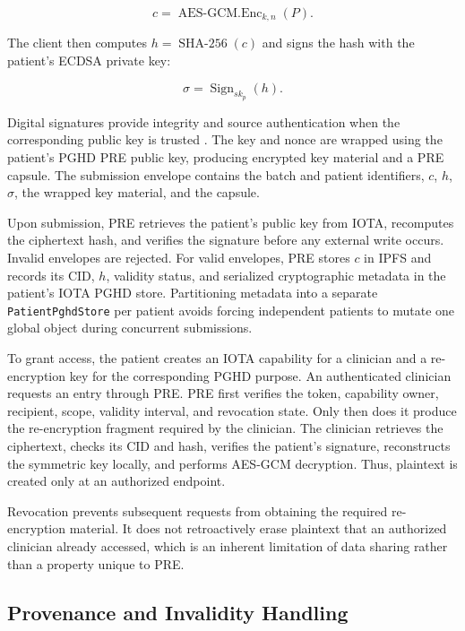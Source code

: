 \begin{equation}
	c = \operatorname{AES\text{-}GCM.Enc}_{k,n}(P).
	\label{eq:encrypt}
\end{equation}

The client then computes \(h=\operatorname{SHA\text{-}256}(c)\) and signs the hash with the patient's ECDSA private key:

\begin{equation}
	\sigma = \operatorname{Sign}_{sk_p}(h).
	\label{eq:signature}
\end{equation}

Digital signatures provide integrity and source authentication when the corresponding public key is trusted \cite{NIST_FIPS186-5}.
The key and nonce are wrapped using the patient's PGHD PRE public key, producing encrypted key material and a PRE capsule.
The submission envelope contains the batch and patient identifiers, \(c\), \(h\), \(\sigma\), the wrapped key material, and the capsule.

Upon submission, PRE retrieves the patient's public key from IOTA, recomputes the ciphertext hash, and verifies the signature before any external write occurs.
Invalid envelopes are rejected.
For valid envelopes, PRE stores \(c\) in IPFS and records its CID, \(h\), validity status, and serialized cryptographic metadata in the patient's IOTA PGHD store.
Partitioning metadata into a separate \texttt{PatientPghdStore} per patient avoids forcing independent patients to mutate one global object during concurrent submissions.

To grant access, the patient creates an IOTA capability for a clinician and a re-encryption key for the corresponding PGHD purpose.
An authenticated clinician requests an entry through PRE.
PRE first verifies the token, capability owner, recipient, scope, validity interval, and revocation state.
Only then does it produce the re-encryption fragment required by the clinician.
The clinician retrieves the ciphertext, checks its CID and hash, verifies the patient's signature, reconstructs the symmetric key locally, and performs AES-GCM decryption.
Thus, plaintext is created only at an authorized endpoint.

Revocation prevents subsequent requests from obtaining the required re-encryption material.
It does not retroactively erase plaintext that an authorized clinician already accessed, which is an inherent limitation of data sharing rather than a property unique to PRE.

\subsection{Provenance and Invalidity Handling}

